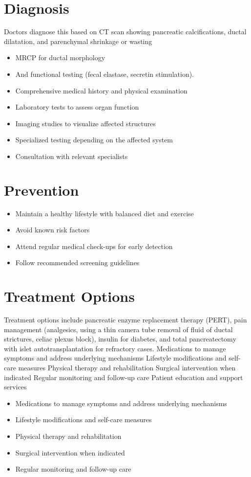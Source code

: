 \section{Diagnosis}
Doctors diagnose this based on CT scan showing pancreatic calcifications, ductal dilatation, and parenchymal shrinkage or wasting

\begin{itemize}[noitemsep]
  \item MRCP for ductal morphology
  \item And functional testing (fecal elastase, secretin stimulation).
  \item Comprehensive medical history and physical examination
  \item Laboratory tests to assess organ function
  \item Imaging studies to visualize affected structures
  \item Specialized testing depending on the affected system
  \item Consultation with relevant specialists
\end{itemize}
\section{Prevention}
\begin{itemize}[noitemsep]
  \item Maintain a healthy lifestyle with balanced diet and exercise
  \item Avoid known risk factors
  \item Attend regular medical check-ups for early detection
  \item Follow recommended screening guidelines
\end{itemize}
\section{Treatment Options}
Treatment options include pancreatic enzyme replacement therapy (PERT), pain management (analgesics, using a thin camera tube removal of fluid of ductal strictures, celiac plexus block), insulin for diabetes, and total pancreatectomy with islet autotransplantation for refractory cases. Medications to manage symptoms and address underlying mechanisms Lifestyle modifications and self-care measures Physical therapy and rehabilitation Surgical intervention when indicated Regular monitoring and follow-up care Patient education and support services

\begin{itemize}[noitemsep]
  \item Medications to manage symptoms and address underlying mechanisms
  \item Lifestyle modifications and self-care measures
  \item Physical therapy and rehabilitation
  \item Surgical intervention when indicated
  \item Regular monitoring and follow-up care
\end{itemize}
